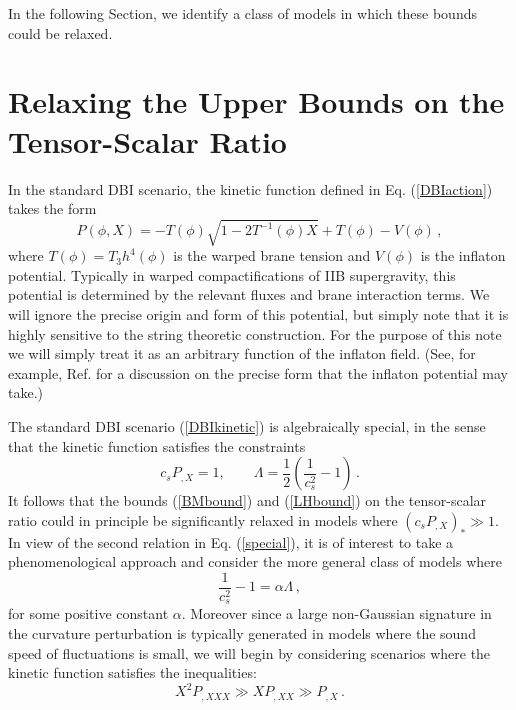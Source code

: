 In the following Section, we identify a class of models in which  
these bounds could be relaxed. 

\section{Relaxing the Upper Bounds on the Tensor-Scalar Ratio}
\label{sec:relaxingbound}

In the standard DBI scenario, the kinetic function defined in 
Eq. (\ref{DBIaction})  takes the form 
\begin{equation}
\label{DBIkinetic}
P (\phi , X) = -T(\phi ) \sqrt{1-2T^{-1}(\phi ) X} + T(\phi ) - V(\phi ) \,,
\end{equation}
where $T(\phi ) = T_3 h^4 (\phi )$ 
is the warped brane tension and  $V(\phi )$ is the 
inflaton potential. 
Typically in warped compactifications of 
IIB supergravity, this potential is determined by the 
relevant fluxes and brane interaction terms. 
We will ignore the precise origin
and form of this potential, but simply
note that it is highly sensitive to the string theoretic construction. For the
purpose of this note we will simply treat it 
as an arbitrary function of the inflaton field.
(See, for example, Ref. \cite{brane5} for a discussion 
on the precise form that the inflaton potential may take.)

The standard DBI scenario (\ref{DBIkinetic}) is algebraically special, 
in the sense that the kinetic function satisfies the constraints 
\begin{equation}
\label{special}
c_s P_{,X} = 1 , \qquad  \Lambda = \frac{1}{2} \left( 
\frac{1}{c_s^2} -1 \right) \,.
\end{equation}
It follows that the 
bounds (\ref{BMbound}) and (\ref{LHbound}) 
on the tensor-scalar ratio could in principle be 
significantly relaxed in models where $(c_sP_{,X})_* \gg 1$. 
In view of the second relation in Eq. (\ref{special}), it is of interest 
to take a phenomenological approach and consider the more  
general class of models where 
\begin{equation}
\label{defalpha}
\frac{1}{c_s^2} -1 = \alpha \Lambda \,,
\end{equation}
for some positive constant $\alpha$. Moreover since 
a large non-Gaussian signature in the curvature perturbation is 
typically generated in models where the sound speed of fluctuations 
is small, we will begin by considering 
scenarios where the kinetic function satisfies the 
inequalities: 
\begin{equation}
\label{Plimits}
X^2 P_{,XXX} \gg XP_{,XX} \gg P_{,X} \,.
\end{equation}

